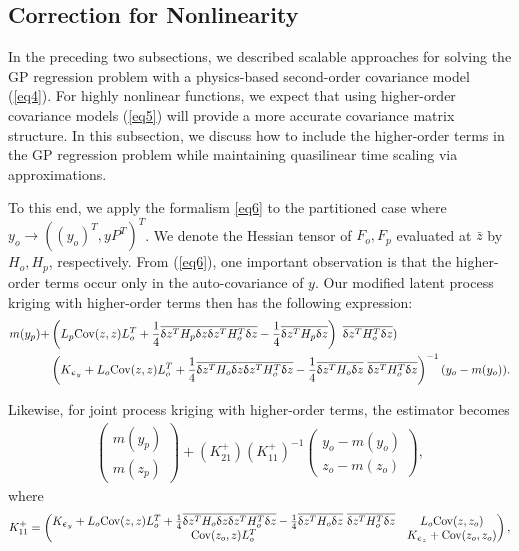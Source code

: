 \documentclass[article,ij4uq]{ij4uq}              %
\begin{document}
\subsection{Correction for Nonlinearity}\label{sec33}
\par In the preceding two subsections, we described scalable approaches for solving the GP regression problem with  a physics-based second-order covariance model (\ref{eq4}). For highly nonlinear functions, we expect that using higher-order covariance models (\ref{eq5}) will provide a more accurate covariance matrix structure. In this subsection, we  discuss how to include the higher-order terms in the GP regression problem while maintaining quasilinear time scaling via approximations. 
\par To this end, we apply the formalism \eqref{eq6} to the partitioned case where $ y_o \rightarrow ((y_o)^T,yP^T)^T$. We denote the Hessian tensor of $F_{o},F_{p}$ evaluated at $\bar{z}$ by $H_{o},H_{p}$, respectively. From (\ref{eq6}), one important observation is that the higher-order terms occur only in the auto-covariance of $y$. Our modified latent process kriging with higher-order terms then has the following expression:
\begin{align}
    m(y_{p})+& \left(L_{p}{\rm{Cov}}(z,z)L_{o}^{T}+\frac{1}{4}\overline{\delta z^{T}H_{p}\delta z\delta z^{T}H_{o}^{T}\delta z}-\frac{1}{4}\overline{\delta z^{T}H_{p}\delta z} \right) \ \overline{\delta z^{T}H_{o}^{T}\delta z})\notag\\
    & \left( K_{\epsilon_{y}}+L_{o}{\rm{Cov}}(z,z)L_{o}^{T}+\frac{1}{4}\overline{\delta z^{T}H_{o}\delta z\delta z^{T}H_{o}^{T}\delta z}-\frac{1}{4}\overline{\delta z^{T}H_{o}\delta z}\ \overline{\delta z^{T}H_{o}^{T}\delta z} \right)^{-1}(y_{o}-m(y_{o})).\label{eq:lntnlkrg}
\end{align}
\par Likewise, for joint process kriging with higher-order terms, the estimator becomes
\begin{align}
    \begin{pmatrix}m(y_{p})\\m(z_{p})\end{pmatrix}+(K_{21}^{+})(K_{11}^{+})^{-1}\begin{pmatrix}y_{o}-m(y_{o})\\z_{o}-m(z_{o})\end{pmatrix},\label{eq:jntnlnkrg}
\end{align}
where
\begin{align}
    K_{11}^{+}=\begin{pmatrix}K_{\epsilon_{y}}+L_{o}{\rm{Cov}}(z,z)L_{o}^{T}+\frac{1}{4}\overline{\delta z^{T}H_{o}\delta z\delta z^{T}H_{o}^{T}\delta z}-\frac{1}{4}\overline{\delta z^{T}H_{o}\delta z}\ \overline{\delta z^{T}H_{o}^{T}\delta z} & L_{o}{\rm{Cov}}(z,z_{o})\\{\rm{Cov}}(z_{o},z)L_{o}^{T} & K_{\epsilon_{z}}+{\rm{Cov}}(z_{o},z_{o})\end{pmatrix}, \label{eq:jntnlnk11}
\end{align}
\end{document}
